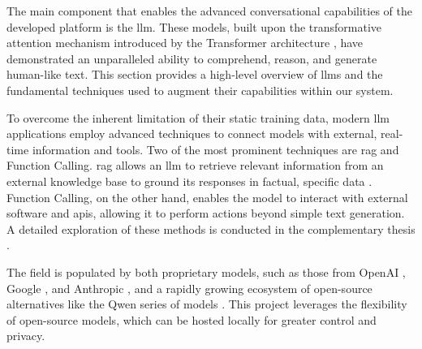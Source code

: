 The main component that enables the advanced conversational capabilities of the developed platform is the \acl{llm}. These models, built upon the transformative attention mechanism introduced by the Transformer architecture \cite{SOTA-TRANSFORMERS}, have demonstrated an unparalleled ability to comprehend, reason, and generate human-like text. This section provides a high-level overview of \acp{llm} and the fundamental techniques used to augment their capabilities within our system.

To overcome the inherent limitation of their static training data, modern \ac{llm} applications employ advanced techniques to connect models with external, real-time information and tools. Two of the most prominent techniques are \ac{rag} and Function Calling. \ac{rag} allows an \ac{llm} to retrieve relevant information from an external knowledge base to ground its responses in factual, specific data \cite{SOTA-RAG-SURVEY}. Function Calling, on the other hand, enables the model to interact with external software and \acp{api}, allowing it to perform actions beyond simple text generation. A detailed exploration of these methods is conducted in the complementary thesis \cite{MUI2ICSI-THESIS}.

The field is populated by both proprietary models, such as those from OpenAI \cite{CHATGPT}, Google \cite{GEMINI}, and Anthropic \cite{CLAUDE}, and a rapidly growing ecosystem of open-source alternatives like the Qwen series of models \cite{QWEN}. This project leverages the flexibility of open-source models, which can be hosted locally for greater control and privacy.